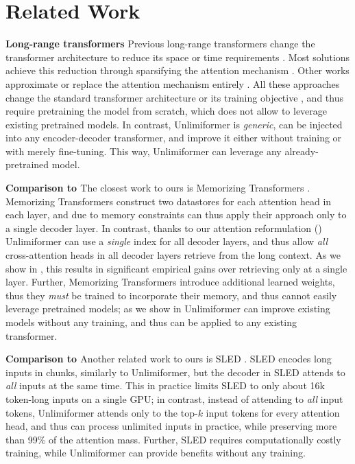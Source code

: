 \documentclass{article}
\newcommand{\ours}{Unlimiformer\xspace}
\begin{document}
\section{Related Work}

\textbf{Long-range transformers} 
Previous long-range transformers
change the transformer architecture to reduce its space or time requirements \citep{efficiency-survey}. 
Most solutions achieve this reduction through sparsifying the attention mechanism \citep{sparse-transformers,reformer,beltagy2020longformer,routing-transformers,ETC,big-bird}. Other works approximate or replace the attention mechanism entirely \citep{linformer,linear-transformers,performers,fnet}. 
All these approaches change the standard transformer architecture or its training objective \citep{zhong2022training}, and thus require pretraining the model from scratch, which does not allow to leverage existing pretrained models. In contrast, \ours is \emph{generic}, can be injected into any encoder-decoder transformer, and improve it either without training or with merely fine-tuning. This way, \ours can leverage any already-pretrained model. 






\textbf{Comparison to \citet{memtrans}} The closest work to ours is Memorizing Transformers \citep{memtrans}. Memorizing Transformers construct two datastores for each attention head in each layer, and due to memory constraints can thus apply their approach only to a single decoder layer. In contrast, thanks to our attention reformulation () \ours can use a \emph{single} index for all decoder layers, and thus allow \emph{all} cross-attention  heads in all decoder layers retrieve from the long context. 
As we show in , this results in significant empirical gains over retrieving only at a single layer.
Further, Memorizing Transformers introduce additional learned weights, thus they \emph{must} be trained to incorporate their memory, and thus cannot easily leverage pretrained models; as we show in  \ours can improve existing models without any training, and thus can be applied to any existing transformer.

\textbf{Comparison to \citet{sled}} Another related work to ours is SLED \citep{sled}. SLED encodes long inputs in chunks, similarly to \ours, but the decoder in SLED attends to \emph{all} inputs at the same time. This in practice limits SLED to only about 16k token-long inputs on a single GPU; in contrast, instead of attending to \emph{all} input tokens, \ours attends only to the top-$k$ input tokens for every attention head, and thus can process unlimited inputs in practice, while preserving more than 99\% of the attention mass.
Further, SLED requires computationally costly training, while \ours can provide benefits without any training.
\end{document}
